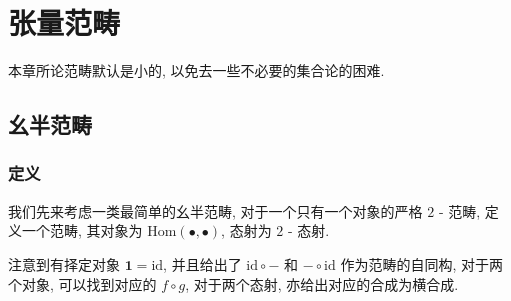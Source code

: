 \section{张量范畴}

本章所论范畴默认是小的, 以免去一些不必要的集合论的困难.

\subsection{幺半范畴}

\subsubsection{定义}

\begin{example}
    我们先来考虑一类最简单的幺半范畴, 对于一个只有一个对象的严格 \(2\) - 范畴,
    定义一个范畴, 其对象为 \(\mathrm{Hom} (\bullet,\bullet)\), 态射为 \(2\) - 态射.

    注意到有择定对象 \(\mathbf{1} = \mathrm{id}\), 并且给出了 \(\mathrm{id} \circ -\) 和 \(- \circ \mathrm{id}\)
    作为范畴的自同构, 对于两个对象, 可以找到对应的 \(f \circ g\), 对于两个态射, 亦给出对应的合成为横合成.
\end{example}

